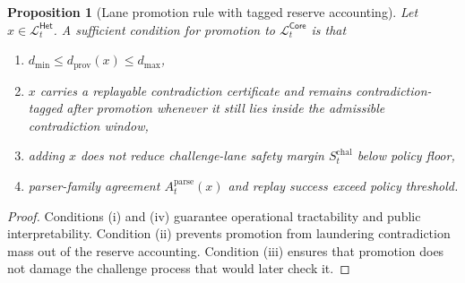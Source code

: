 \documentclass[11pt]{article}
\newtheorem{proposition}[theorem]{Proposition}
\theoremstyle{definition}
\newcommand{\1}{\mathbf{1}}
\newcommand{\Core}{\mathsf{Core}}
\newcommand{\Het}{\mathsf{Het}}
\begin{document}
\begin{proposition}[Lane promotion rule with tagged reserve accounting]\label{prop:promotion}
Let $x\in\mathcal L_t^{\Het}$. A sufficient condition for promotion to $\mathcal L_t^{\Core}$ is that
\begin{enumerate}[label=(\roman*), leftmargin=2em]
  \item $d_{\min}\le d_{\mathrm{prov}}(x)\le d_{\max}$,
  \item $x$ carries a replayable contradiction certificate and remains contradiction-tagged after promotion whenever it still lies inside the admissible contradiction window,
  \item adding $x$ does not reduce challenge-lane safety margin $S_t^{\mathrm{chal}}$ below policy floor,
  \item parser-family agreement $A_t^{\mathrm{parse}}(x)$ and replay success exceed policy threshold.
\end{enumerate}
\end{proposition}

\begin{proof}
Conditions (i) and (iv) guarantee operational tractability and public interpretability. Condition (ii) prevents promotion from laundering contradiction mass out of the reserve accounting. Condition (iii) ensures that promotion does not damage the challenge process that would later check it.
\end{proof}
\end{document}
